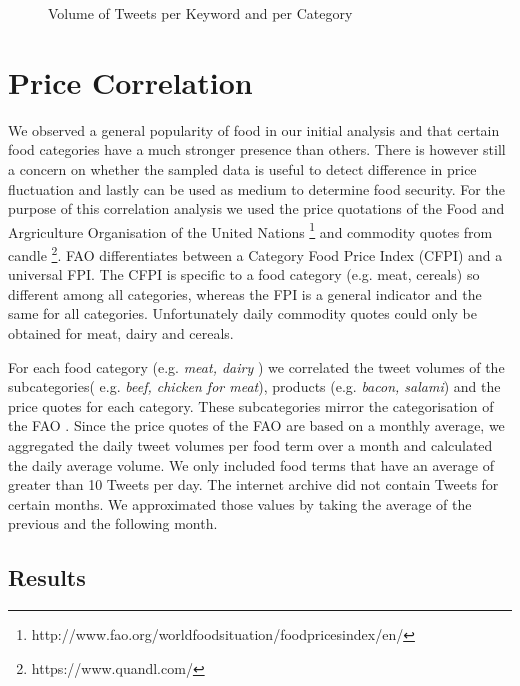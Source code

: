 \begin{figure}[H]
        \caption{Volume of Tweets per Keyword and per Category}\label{fig:distribution}
\end{figure}


\section{Price Correlation}


We observed a general popularity of food in our initial analysis and that certain food categories have a much stronger presence than others. There is however still a concern on whether the sampled data is useful to detect difference in price fluctuation and lastly can  be used as medium to determine food security. For the purpose of this correlation analysis we used the price quotations of the Food and Argriculture Organisation of the United Nations \footnote{http://www.fao.org/worldfoodsituation/foodpricesindex/en/} and commodity quotes from candle \footnote{https://www.quandl.com/}. FAO differentiates between a Category Food Price Index (CFPI) and a universal FPI. The CFPI is specific to a food category (e.g. meat, cereals) so different among all categories, whereas the FPI is a general indicator and  the same for all categories. Unfortunately daily commodity quotes could only be obtained for meat, dairy and cereals. 

For each food category (e.g. \emph{meat, dairy} ) we correlated the tweet volumes of the subcategories( e.g. \emph{beef, chicken for meat}), products (e.g. \emph{bacon, salami}) and the price quotes for each category. These subcategories mirror the categorisation of the FAO \cite{fao2008}. Since the price quotes of the FAO are based on a monthly average, we aggregated the daily tweet volumes per food term over a month and calculated the daily average volume. We only included food terms that have an average of greater than 10 Tweets per day. The internet archive did not contain Tweets for certain months. We approximated those values by taking the average of the previous and the following month. 

\subsection{Results} 
\label{corr_results}

